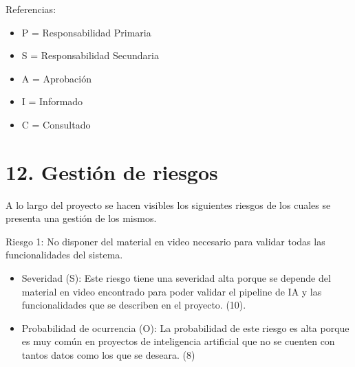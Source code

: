 \documentclass[11pt]{charter}
\begin{document}
\begin{table}[htpb]
\centering
{}
\end{table}


Referencias:
\begin{itemize}
	\item P = Responsabilidad Primaria
	\item S = Responsabilidad Secundaria
	\item A = Aprobación
	\item I = Informado
	\item C = Consultado
\end{itemize}

\newpage

\section{12. Gestión de riesgos}
\label{sec:riesgos}

A lo largo del proyecto se hacen visibles los siguientes riesgos de los cuales se presenta una gestión
de los mismos.
 
Riesgo 1: No disponer del material en video necesario para validar todas las funcionalidades del sistema.
\begin{itemize}
\item Severidad (S): Este riesgo tiene una severidad alta porque se depende del material en video encontrado para poder validar el pipeline de IA y las funcionalidades que se describen en el proyecto. (10).
\item Probabilidad de ocurrencia (O): La probabilidad de este riesgo es alta porque es muy común en proyectos de inteligencia artificial que no se cuenten con tantos datos como los que se deseara. (8)
\end{itemize}   
\end{document}
